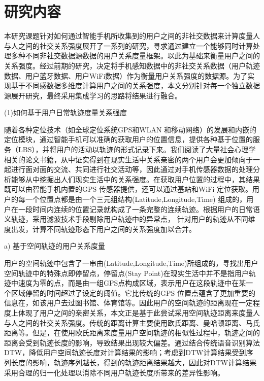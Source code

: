 \section{研究内容}
本研究课题针对如何通过智能手机所收集到的用户之间的非社交数据来计算度量人与人之间的社交关系强度展开了一系列的研究，寻求通过建立一个能够同时计算处理多种不同非社交数据源数据的用户关系度量框架。以此为基础来衡量用户之间的关系强度。经过前期的研究，决定将手机感知数据中的非社交关系数据（用户轨迹数据、用户蓝牙数据、用户WiFi数据）作为衡量用户关系强度的数据源。为了实现基于不同感数据多维度计算用户之间的关系强度，本文分别针对每一个独立数据源展开研究，最终采用集成学习的思路将结果进行融合。
\par (1)如何基于用户日常轨迹度量关系强度
\par 随着各种定位技术（如全球定位系统GPS和WLAN 和移动网络）的发展和内嵌的定位模块，通过智能手机可以准确的获取用户的位置信息，提供各种基于位置的服务（LBS），并将用户的活动以轨迹的形式记录下来。我们阅读了大量社会心理学相关的论文书籍，从中证实得到在现实生活中关系亲密的两个用户会更加倾向于一起进行面对面的交流、共同进行社交活动等，因此通过对手机传感器数据的处理分析能够从中挖掘出人们现实生活中的关系强度。在获取用户位置的过程中，其结果既可以由智能手机内置的GPS 传感器提供，还可以通过基站和WiFi 定位获取。用户的每一个位置点都是由一个三元组结构(Latitude,Longitude,Time) 组成的，用户在一段时间内连续的位置记录就构成了一条完整的连续轨迹。根据用户的日常语义轨迹，采用滤波技术手段剔除用户轨迹中的异常点，%
针对用户的轨迹从不同维度出发，计算不同轨迹形态下用户之间的关系强度加以合并。
\par a) 基于空间轨迹的用户关系度量
\par  用户的空间轨迹中包含了一串由(Latitude,Longitude,Time)所组成的，寻找出用户空间轨迹中的特殊点即停留点，停留点(Stay Point)在现实生活中并不是指用户轨迹中速度为零的点，而是由一组GPS点构成区域，表示用户在这段轨迹中在某一个区域停留的时间超过了设定的阈值。它比传统的GPS 位置点蕴含了更加重要的信息在，如该用户去过图书馆、体育馆等。因此用户的空间轨迹的距离现在一定程度上体现了用户之间的亲密关系，本文正是基于此尝试采用空间轨迹距离来度量人与人之间的社交关系强度。传统的距离计算主要使用欧氏距离、曼哈顿距离、马氏距离等。但是，在使用欧氏距离来度量用户空间轨迹的相似性过程中，轨迹之间的距离会受到轨迹长度的影响，导致结果出现较大偏差。通过结合传统语音识别算法DTW，降低用户空间轨迹长度对计算结果的影响；考虑到DTW计算结果受到序列长度的影响，轨迹序列越长，得到的轨迹距离结果越大，因此对DTW计算结果采用合理的归一化处理以消除不同用户轨迹长度所带来的差异性影响。
